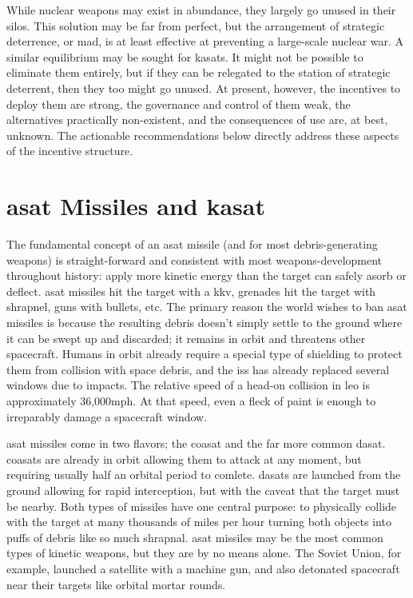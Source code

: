 While nuclear weapons may exist in abundance, they largely go unused
in their silos.  This solution may be far from perfect, but the
arrangement of strategic deterrence, or \ac{mad}, is at least
effective at preventing a large-scale nuclear war.  A similar
equilibrium may be sought for \acp{kasat}.  It might not be possible
to eliminate them entirely, but if they can be relegated to the
station of strategic deterrent, then they too might go unused.  At
present, however, the incentives to deploy them are strong, the
governance and control of them weak, the alternatives practically
non-existent, and the consequences of use are, at best, unknown.  The
actionable recommendations below directly address these aspects of the
incentive structure.

\section*{\ac{asat} Missiles and \acf{kasat}}

The fundamental concept of an \ac{asat} missile (and for most
debris-generating weapons) is straight-forward and consistent with
most weapons-development throughout history: apply more kinetic energy
than the target can safely asorb or deflect.  \ac{asat} missiles hit
the target with a \ac{kkv}, grenades hit the target with shrapnel,
guns with bullets, etc.  The primary reason the world wishes to ban
\ac{asat} missiles is because the resulting debris doesn't simply
settle to the ground where it can be swept up and discarded; it
remains in orbit and threatens other spacecraft.  Humans in orbit
already require a special type of shielding to protect them from
collision with space debris, and the \ac{iss} has already replaced
several windows due to impacts.  The relative speed of a head-on
collision in \ac{leo} is approximately 36,000mph.  At that speed, even
a fleck of paint is enough to irreparably damage a spacecraft window.

\ac{asat} missiles come in two flavors; the \acf{coasat} and the far
more common \acf{dasat}.  \acp{coasat} are already in orbit allowing
them to attack at any moment, but requiring usually half an orbital
period to comlete.  \acp{dasat} are launched from the ground allowing
for rapid interception, but with the caveat that the target must be
nearby.  Both types of missiles have one central purpose: to
physically collide with the target at many thousands of miles per hour
turning both objects into puffs of debris like so much shrapnal.
\ac{asat} missiles may be the most common types of kinetic weapons,
but they are by no means alone.  The Soviet Union, for example,
launched a satellite with a machine gun, and also detonated spacecraft
near their targets like orbital mortar rounds.


